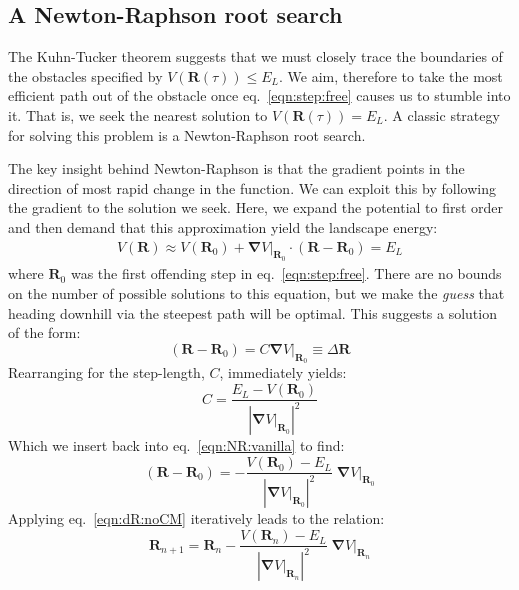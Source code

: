 \documentclass[letterpaper]{tufte-handout}
\newcommand{\laeq}[1]{\label{eqn:#1}}
\renewcommand{\refeq}[1]{eq.~\ref{eqn:#1}}
\renewcommand{\vec}[1]{\mathbf{#1}}
\newcommand{\cvec}[1]{\vec{#1}}
\renewcommand{\refeq}[1]{eq.~\ref{eqn:#1}}
\begin{document}
\subsection{A Newton-Raphson root search}
The Kuhn-Tucker theorem suggests that we must closely trace the boundaries of the obstacles specified by $V(\cvec{R}(\tau)) \le E_L$. We aim, therefore to take the most efficient path out of the obstacle once \refeq{step:free} causes us to stumble into it. That is, we seek the nearest solution to $V(\cvec{R}(\tau)) = E_L$. A classic strategy for solving this problem is a Newton-Raphson root search.

The key insight behind Newton-Raphson is that the gradient points in the direction of most rapid change in the function. We can exploit this by following the gradient to the solution we seek. Here, we expand the potential to first order and then demand that this approximation yield the landscape energy:
\begin{align}\laeq{expansion}
  V(\cvec{R}) \approx  V(\cvec{R}_0) + \left. \cvec{\nabla}V\right|_{\cvec{R}_0} \cdot (\cvec{R} - \cvec{R}_0) = E_L
\end{align}
where $\cvec{R}_0$ was the first offending step in \refeq{step:free}. There are no bounds on the number of possible solutions to this equation, but we make the \emph{guess} that heading downhill via the steepest path will be optimal. This suggests a solution of the form:
\begin{equation}\laeq{NR:vanilla}
  (\cvec{R} - \cvec{R}_0) = C \left. \cvec{\nabla} V\right|_{\cvec{R}_0} \equiv \Delta\cvec{R}
\end{equation}
Rearranging for the step-length, $C$, immediately yields:
\[
  C = \frac{E_L - V(\cvec{R}_0)}{{\left| \left. \cvec{\nabla} V\right|_{\cvec{R}_0} \right|}^2}
\]
Which we insert back into \refeq{NR:vanilla} to find:
\begin{equation}\laeq{dR:noCM}
  (\cvec{R} - \cvec{R}_0) = - \frac{V \left(\cvec{R}_0\right) - E_L}{ {\left| {\left. \cvec{\nabla}V \right|}_{\cvec{R}_0} \right|}^2} \; {\left. \cvec{\nabla}V \right|}_{\cvec{R}_0}
\end{equation}
Applying \refeq{dR:noCM} iteratively leads to the relation:
\begin{equation}\laeq{step:escape}
  \boxed{
    \cvec{R}_{n+1} = \cvec{R}_{n} -    \frac{V \left(\cvec{R}_n\right) - E_L}{ {\left| {\left. \cvec{\nabla}V \right|}_{\cvec{R}_n} \right|}^2} \; {\left. \cvec{\nabla}V \right|}_{\cvec{R}_n}
  }
\end{equation}
\end{document}
